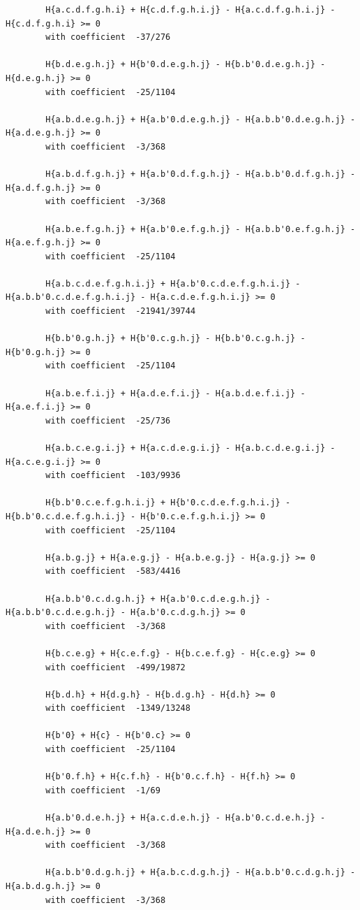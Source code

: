 \documentclass[11pt, a4paper]{kybernetika}
\begin{document}
\begin{verbatim}
		H{a.c.d.f.g.h.i} + H{c.d.f.g.h.i.j} - H{a.c.d.f.g.h.i.j} - H{c.d.f.g.h.i} >= 0
		with coefficient  -37/276
		
		H{b.d.e.g.h.j} + H{b'0.d.e.g.h.j} - H{b.b'0.d.e.g.h.j} - H{d.e.g.h.j} >= 0
		with coefficient  -25/1104
		
		H{a.b.d.e.g.h.j} + H{a.b'0.d.e.g.h.j} - H{a.b.b'0.d.e.g.h.j} - H{a.d.e.g.h.j} >= 0
		with coefficient  -3/368
		
		H{a.b.d.f.g.h.j} + H{a.b'0.d.f.g.h.j} - H{a.b.b'0.d.f.g.h.j} - H{a.d.f.g.h.j} >= 0
		with coefficient  -3/368
		
		H{a.b.e.f.g.h.j} + H{a.b'0.e.f.g.h.j} - H{a.b.b'0.e.f.g.h.j} - H{a.e.f.g.h.j} >= 0
		with coefficient  -25/1104
		
		H{a.b.c.d.e.f.g.h.i.j} + H{a.b'0.c.d.e.f.g.h.i.j} - H{a.b.b'0.c.d.e.f.g.h.i.j} - H{a.c.d.e.f.g.h.i.j} >= 0
		with coefficient  -21941/39744
		
		H{b.b'0.g.h.j} + H{b'0.c.g.h.j} - H{b.b'0.c.g.h.j} - H{b'0.g.h.j} >= 0
		with coefficient  -25/1104
		
		H{a.b.e.f.i.j} + H{a.d.e.f.i.j} - H{a.b.d.e.f.i.j} - H{a.e.f.i.j} >= 0
		with coefficient  -25/736
		
		H{a.b.c.e.g.i.j} + H{a.c.d.e.g.i.j} - H{a.b.c.d.e.g.i.j} - H{a.c.e.g.i.j} >= 0
		with coefficient  -103/9936
		
		H{b.b'0.c.e.f.g.h.i.j} + H{b'0.c.d.e.f.g.h.i.j} - H{b.b'0.c.d.e.f.g.h.i.j} - H{b'0.c.e.f.g.h.i.j} >= 0
		with coefficient  -25/1104
		
		H{a.b.g.j} + H{a.e.g.j} - H{a.b.e.g.j} - H{a.g.j} >= 0
		with coefficient  -583/4416
		
		H{a.b.b'0.c.d.g.h.j} + H{a.b'0.c.d.e.g.h.j} - H{a.b.b'0.c.d.e.g.h.j} - H{a.b'0.c.d.g.h.j} >= 0
		with coefficient  -3/368
		
		H{b.c.e.g} + H{c.e.f.g} - H{b.c.e.f.g} - H{c.e.g} >= 0
		with coefficient  -499/19872
		
		H{b.d.h} + H{d.g.h} - H{b.d.g.h} - H{d.h} >= 0
		with coefficient  -1349/13248
		
		H{b'0} + H{c} - H{b'0.c} >= 0
		with coefficient  -25/1104
		
		H{b'0.f.h} + H{c.f.h} - H{b'0.c.f.h} - H{f.h} >= 0
		with coefficient  -1/69
		
		H{a.b'0.d.e.h.j} + H{a.c.d.e.h.j} - H{a.b'0.c.d.e.h.j} - H{a.d.e.h.j} >= 0
		with coefficient  -3/368
		
		H{a.b.b'0.d.g.h.j} + H{a.b.c.d.g.h.j} - H{a.b.b'0.c.d.g.h.j} - H{a.b.d.g.h.j} >= 0
		with coefficient  -3/368
		

\end{verbatim}
\end{document}
